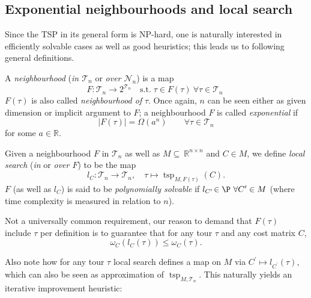 \documentclass[index=totoc,bibliography=totoc]{scrartcl}
\numberwithin{equation}{section}
\numberwithin{figure}{section}
\numberwithin{table}{section}
\let\defstyle\itshape
\begin{document}
\subsection{Exponential neighbourhoods and local search}

Since the TSP in its general form is NP-hard, one is naturally interested
in efficiently solvable cases as well as good heuristics; this leads us to
following general definitions.

\begin{define}
  A {\defstyle neighbourhood}
  ({\defstyle in $\mathcal{T}_n$} or {\defstyle over $\mathcal{N}_n$}) is a map
  \[
    F: \mathcal{T}_n \to 2^{\mathcal{T}_n}
    \quad \text{s.t.}\; \tau \in F\left(\tau\right) \ \forall \tau \in \mathcal{T}_n\;
  \]
  $F(\tau)$ is also called {\defstyle neighbourhood of} $\tau$.
  Once again, $n$ can be seen either as given dimension or implicit
  argument to $F$; a neighbourhood $F$ is called {\defstyle exponential} if
  \[
    \left\vert F(\tau) \right\vert = \Omega(a^n) \qquad \forall \tau \in \mathcal{T}_n
  \]
  for some $a \in \mathbb{R}$.
\end{define}

\begin{define}
  Given a neighbourhood $F$ in $\mathcal{T}_n$
  as well as $M \subseteq~\mathbb{R}^{n \times n}$ and $C \in M$,
  we define {\defstyle local search}
  ({\defstyle in} or {\defstyle over $F$}) to be the map
  \[
    l_C :
    \mathcal{T}_n \to \mathcal{T}_n, \quad
    \tau \mapsto \operatorname{tsp}_{M,F(\tau)}\left(C\right).
  \]
  $F$ (as well as $l_C$) is said to be {\defstyle polynomially solvable} if
  $l_{C^\prime}\!\in \P \ \forall C^\prime \in M$
  (where time complexity is measured in relation to $n$).
\end{define}

\begin{remark}
  Not a universally common requirement, our reason to demand that
  $F\left(\tau\right)$ include $\tau$ per definition
  is to guarantee that for any tour $\tau$ and any cost matrix $C$,
  \[
    \omega_C\left(l_C\left(\tau\right)\right) \leq \omega_C\left(\tau\right).
  \]
\end{remark}

Also note how for any tour $\tau$ local search defines a map on $M$ via
$C^\prime \mapsto l_{C^\prime}\left(\tau\right)$, which can also be seen as
approximation of $\operatorname{tsp}_{M,\mathcal{T}_n}$.  This naturally
yields an iterative improvement heuristic:
\end{document}
